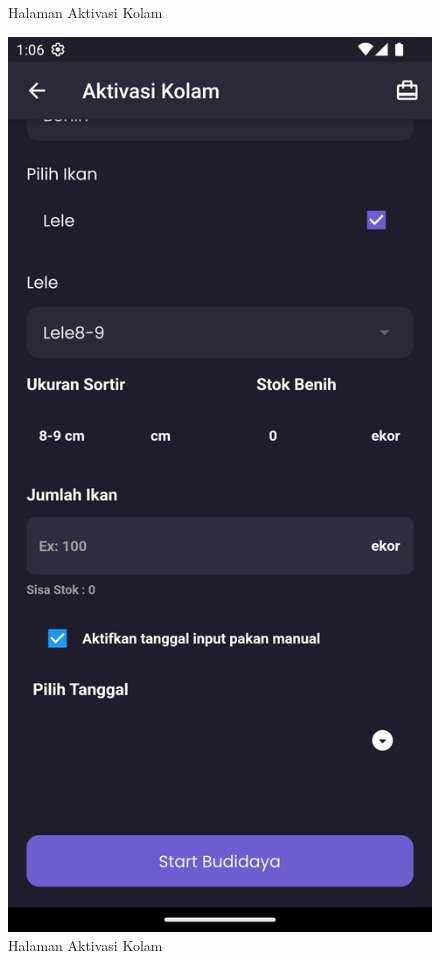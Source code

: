 \begin{spacing}{1.5}
\begin{enumerate}
\begin{figure}[H]
				\caption{Halaman Aktivasi Kolam}
			\endminipage\hfill
				\includegraphics[width=\linewidth]{gambar/sprint4/aktivasi_2.png}
				\caption{Halaman Aktivasi Kolam}
			\endminipage\hfill
		\end{figure}


\end{enumerate}
\end{spacing}
